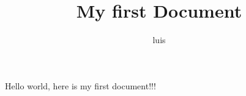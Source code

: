 \documentclass{book}
\begin{document}
\title{My first  Document}
\author{luis}
\maketitle
Hello world, here is my first document!!!
\end{document}
